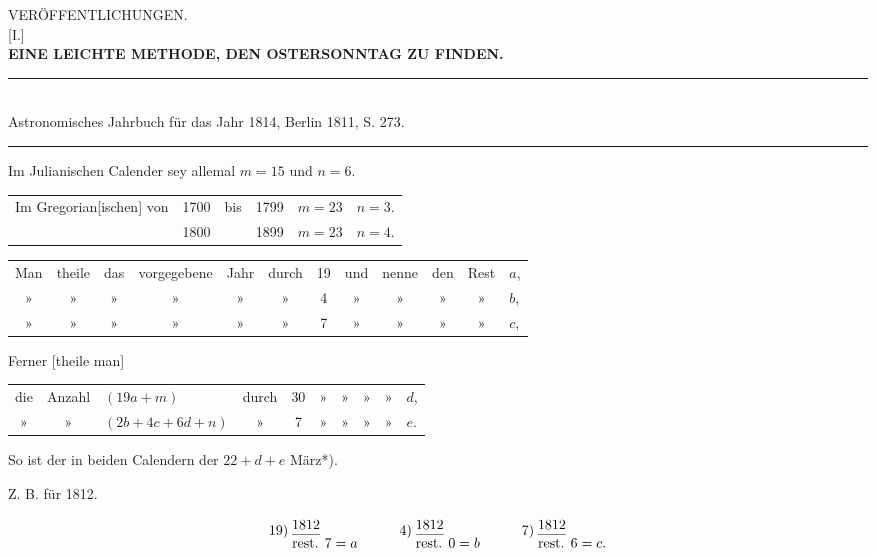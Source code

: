 \clearpage\begingroup\NoSourceHead{}
\begin{center}
{\Large VERÖFFENTLICHUNGEN.}\\[1.8em]
{[I.]}\\[.8em]
\textbf{EINE LEICHTE METHODE, DEN OSTERSONNTAG ZU FINDEN.}\\[.7em]
\rule{.86\textwidth}{.35pt}\\[.2em]
{\small Astronomisches Jahrbuch für das Jahr 1814, Berlin 1811, S. 273.}\\[.2em]
\rule{.86\textwidth}{.35pt}
\end{center}
\noindent Im Julianischen Calender sey allemal $m=15$ und $n=6$.
\begin{center}
\begin{tabular}{@{}l r c r l l@{}}
Im Gregorian[ischen] von&1700&bis&1799&$m=23$&$n=3$.\\
&1800&&1899&$m=23$&$n=4$.
\end{tabular}
\end{center}
\begin{center}\small\setlength{\tabcolsep}{1.8pt}
\begin{tabular}{@{}cccccccccccl@{}}
Man&theile&das&vorgegebene&Jahr&durch&19&und&nenne&den&Rest&$a$,\\
»&»&»&»&»&»&4&»&»&»&»&$b$,\\
»&»&»&»&»&»&7&»&»&»&»&$c$,
\end{tabular}
\end{center}
\noindent Ferner [theile man]
\begin{center}\small\setlength{\tabcolsep}{3pt}
\begin{tabular}{@{}cclcccccc l@{}}
die&Anzahl&$(19a+m)$&durch&30&»&»&»&»&$d$,\\
»&»&$(2b+4c+6d+n)$&»&7&»&»&»&»&$e$.
\end{tabular}
\end{center}
\noindent So ist der  in beiden Calendern der $22+d+e$ März*).
\begingroup\renewcommand{\thefootnote}{}\endgroup
\begin{center}Z. B. für 1812.\end{center}
\[
\begin{array}{r@{\;}l}
&1812\\[-8pt]19)&\rule{2em}{.35pt}\\[-3pt]&\text{rest. }7=a
\end{array}
\qquad
\begin{array}{r@{\;}l}
&1812\\[-8pt]4)&\rule{2em}{.35pt}\\[-3pt]&\text{rest. }0=b
\end{array}
\qquad
\begin{array}{r@{\;}l}
&1812\\[-8pt]7)&\rule{2em}{.35pt}\\[-3pt]&\text{rest. }6=c.
\end{array}
\]
